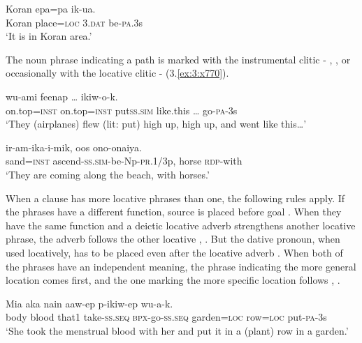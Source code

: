 \ea%
\label{ex:4:x1801}
\gll Koran  epa=pa    ik-ua. \\
    Koran  place=\textsc{loc}  3.\textsc{dat}  be-\textsc{pa}.3s  \\
\glt`It is in Koran area.'
\z

The noun phrase indicating a path is marked with the instrumental clitic - , , or occasionally with the locative clitic - (3.\ref{ex:3:x770}).

\ea%
\label{ex:4:x866}
\gll {}   wu-ami  feenap  {\dots}  ikiw-o-k. \\
  on.top=\textsc{inst}  on.top=\textsc{inst}  put\textsc{ss}.\textsc{sim}  like.this  {\dots}  go-\textsc{pa}-3s    \\
\glt`They (airplanes) flew (lit: put) high up, high up, and went like this{\dots}'
\z

\ea%
\label{ex:4:x867}
\gll {}  ir-am-ika-i-mik,  oos  ono-onaiya. \\
   sand=\textsc{inst}  ascend-\textsc{ss}.\textsc{sim}-be-Np-\textsc{pr}.1/3p,  horse  \textsc{rdp}-with   \\
\glt`They are coming along the beach, with horses.'
\z

When a clause has more locative phrases than one, the following rules apply. If  the phrases have a different function, source is placed before goal . When they have the same function and a deictic locative adverb strengthens another locative phrase, the adverb follows the other locative , . But  the dative pronoun, when used locatively, has to be placed even after the locative adverb . When both of the phrases have an independent meaning, the phrase indicating the more general location comes first, and the one marking the more specific location follows , .

\ea%
\label{ex:4:x868}
\gll Mia  aka  nain  aaw-ep  p-ikiw-ep     wu-a-k.\\
   body  blood  that1  take-\textsc{ss}.\textsc{seq}  \textsc{bpx}-go-\textsc{ss}.\textsc{seq}  garden=\textsc{loc}    row=\textsc{loc}  put-\textsc{pa}-3s  \\
\glt`She took the menstrual blood with her and put it in a (plant) row in a garden.'
\z


